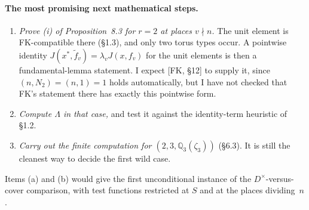 \documentclass[11pt]{article}
\begin{document}
\paragraph{The most promising next mathematical steps.}
\begin{enumerate}[label=(\alph*)]
\item \emph{Prove (i) of Proposition~8.3 for $r=2$ at places
$v\nmid n$.} The unit element is FK-compatible there (\S1.3), and only
two torus types occur. A pointwise identity
$J(x^*,\widetilde f_v)=\lambda_vJ(x,f_v)$ for the unit elements is then
a fundamental-lemma statement. I expect [FK, \S12] to supply it, since
$(n,N_2)=(n,1)=1$ holds automatically, but I have not checked that
FK's statement there has exactly this pointwise form.
\item \emph{Compute $\Lambda$ in that case,} and test it against the
identity-term heuristic of \S1.2.
\item \emph{Carry out the finite computation for
$(2,3,\mathbb Q_3(\zeta_3))$} (\S6.3). It is still the cleanest way to
decide the first wild case.
\end{enumerate}
Items (a) and (b) would give the first unconditional instance of the
$D^\times$-versus-cover comparison, with test functions restricted at
$S$ and at the places dividing~$n$.
\end{document}
